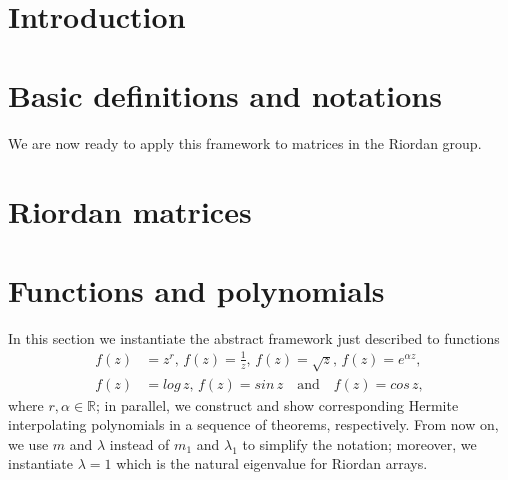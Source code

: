 
\section{Introduction}

\label{sec:introduction}


\section{Basic definitions and notations}



We are now ready to apply this framework to matrices in the Riordan group.

\section{Riordan matrices}



\iffalse %



\subsection{A component matrices characterization of Hermite interpolating polynomials}


\fi

\section{Functions and polynomials}

In this section we instantiate the abstract framework just described to functions
\begin{displaymath}
\begin{split}
f(z)&=z^{r},\,{f(z)=\frac{1}{z}},\,{f(z)=\sqrt{z}},\,{f(z)=e^{\alpha z}},\\
f(z)&=log\,{z},\,f(z)=sin\,{z}\quad\text{and}\quad f(z)=cos\,{z},
\end{split}
\end{displaymath}
where $r,\alpha\in\mathbb{R}$; in parallel, we construct and show corresponding
Hermite interpolating polynomials in a sequence of theorems, respectively.
From now on, we use $m$ and $\lambda$ instead of $m_{1}$ and $\lambda_{1}$ to
simplify the notation; moreover, we instantiate $\lambda=1$ which is the
natural eigenvalue for Riordan arrays.

